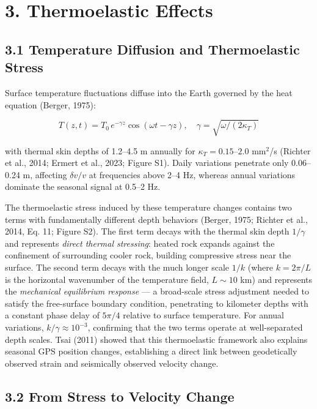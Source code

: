 \documentclass[12pt]{article}
\begin{document}
\section{3. Thermoelastic Effects}\label{thermoelastic-effects}

\subsection{3.1 Temperature Diffusion and Thermoelastic
Stress}\label{temperature-diffusion-and-thermoelastic-stress}

Surface temperature fluctuations diffuse into the Earth governed by the
heat equation (Berger, 1975):

\[T(z,t) = T_0 \, e^{-\gamma z} \cos(\omega t - \gamma z), \quad \gamma = \sqrt{\omega/(2\kappa_T)} \tag{8}\]

with thermal skin depths of 1.2--4.5 m annually for
\(\kappa_T = 0.15\)--\(2.0\) mm\(^2\)/s (Richter et al., 2014; Ermert et
al., 2023; Figure S1). Daily variations penetrate only 0.06--0.24 m,
affecting \(\delta v/v\) at frequencies above 2--4 Hz, whereas annual
variations dominate the seasonal signal at 0.5--2 Hz.

The thermoelastic stress induced by these temperature changes contains
two terms with fundamentally different depth behaviors (Berger, 1975;
Richter et al., 2014, Eq. 11; Figure S2). The first term decays with the
thermal skin depth \(1/\gamma\) and represents \emph{direct thermal
stressing}: heated rock expands against the confinement of surrounding
cooler rock, building compressive stress near the surface. The second
term decays with the much longer scale \(1/k\) (where \(k = 2\pi/L\) is
the horizontal wavenumber of the temperature field, \(L \sim 10\) km)
and represents the \emph{mechanical equilibrium response} --- a
broad-scale stress adjustment needed to satisfy the free-surface
boundary condition, penetrating to kilometer depths with a constant
phase delay of \(5\pi/4\) relative to surface temperature. For annual
variations, \(k/\gamma \approx 10^{-3}\), confirming that the two terms
operate at well-separated depth scales. Tsai (2011) showed that this
thermoelastic framework also explains seasonal GPS position changes,
establishing a direct link between geodetically observed strain and
seismically observed velocity change.

\subsection{3.2 From Stress to Velocity
Change}\label{from-stress-to-velocity-change}
\end{document}
